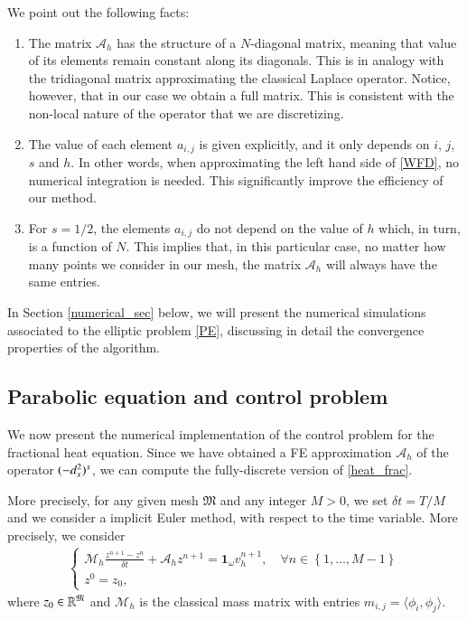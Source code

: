 \begin{remark}
We point out the following facts:
\begin{enumerate}
	\item The matrix $\mathcal A_h$ has the structure of a $N$-diagonal matrix, meaning that value of its elements remain constant along its diagonals. This is in analogy with the tridiagonal matrix approximating the classical Laplace operator. Notice, however, that in our case we obtain a full matrix. This is consistent with the non-local nature of the operator that we are discretizing.
	
	\item The value of each element $a_{i,j}$ is given explicitly, and it only depends on $i$, $j$, $s$ and $h$. In other words, when approximating the left hand side of \eqref{WFD}, no numerical integration is needed. This significantly improve the efficiency of our method.
	
	\item For $s=1/2$, the elements $a_{i,j}$ do not depend on the value of $h$ which, in turn, is a function of $N$. This implies that, in this particular case, no matter how many points we consider in our mesh, the matrix $\mathcal A_h$ will always have the same entries. 
\end{enumerate}
\end{remark}

In Section \ref{numerical_sec} below, we will present the numerical simulations associated to  the elliptic problem \eqref{PE}, discussing in detail the convergence properties of the algorithm. 

\subsection{Parabolic equation and control problem}\label{fe_parabolic}

We now present the numerical implementation of the control problem for the fractional heat equation. Since we have obtained a FE approximation $\mathcal A_h$ of the operator $(-d_x^2)^{s}$, we can compute the fully-discrete version of \eqref{heat_frac}. 

More precisely, for any given mesh $\mathfrak M$ and any integer $M>0$, we set $\delta t=T/M$ and we consider a implicit Euler method, with respect to the time variable. More precisely, we consider
%
\begin{align}\label{frac_heat_num}
	\begin{cases}
		\displaystyle\mathcal M_h \frac{z^{n+1}-z^n}{\delta t}+\mathcal A_h z^{n+1}=\mathbf{1}_\omega v_h^{n+1}, \quad \forall n\in \left\{1,\ldots,M-1\right\}
		\\
		z^0=z_0, 
	\end{cases}
\end{align}
%
where $z_0\in \mathbb R^{\mathfrak{M}}$ and $\mathcal M_h$ is the classical mass matrix with entries $m_{i,j}=\langle \phi_i,\phi_j\rangle$.

